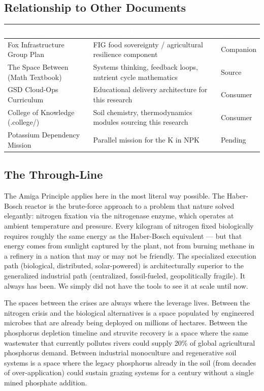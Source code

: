 \documentclass[11pt,letterpaper]{article}
\newcommand{\tableheader}[1]{\textbf{\sffamily\textcolor{white}{#1}}}
\begin{document}
\subsection{Relationship to Other Documents}

\begin{center}
\begin{tabularx}{\textwidth}{L{4cm}XC{2.5cm}}
\toprule
{}
\tableheader{Document} & \tableheader{Relationship} & \tableheader{Status} \\
\midrule
Fox Infrastructure Group Plan & FIG food sovereignty / agricultural resilience component & Companion \\
The Space Between (Math Textbook) & Systems thinking, feedback loops, nutrient cycle mathematics & Source \\
GSD Cloud-Ops Curriculum & Educational delivery architecture for this research & Consumer \\
College of Knowledge (.college/) & Soil chemistry, thermodynamics modules sourcing this research & Consumer \\
Potassium Dependency Mission & Parallel mission for the K in NPK & Pending \\
\bottomrule
\end{tabularx}
\end{center}

\subsection{The Through-Line}

The Amiga Principle applies here in the most literal way possible. The Haber-Bosch reactor is the brute-force approach to a problem that nature solved elegantly: nitrogen fixation via the nitrogenase enzyme, which operates at ambient temperature and pressure. Every kilogram of nitrogen fixed biologically requires roughly the same energy as the Haber-Bosch equivalent --- but that energy comes from sunlight captured by the plant, not from burning methane in a refinery in a nation that may or may not be friendly. The specialized execution path (biological, distributed, solar-powered) is architecturally superior to the generalized industrial path (centralized, fossil-fueled, geopolitically fragile). It always has been. We simply did not have the tools to see it at scale until now.

The spaces between the crises are always where the leverage lives. Between the nitrogen crisis and the biological alternatives is a space populated by engineered microbes that are already being deployed on millions of hectares. Between the phosphorus depletion timeline and struvite recovery is a space where the same wastewater that currently pollutes rivers could supply 20\% of global agricultural phosphorus demand. Between industrial monoculture and regenerative soil systems is a space where the legacy phosphorus already in the soil (from decades of over-application) could sustain grazing systems for a century without a single mined phosphate addition.
\end{document}
